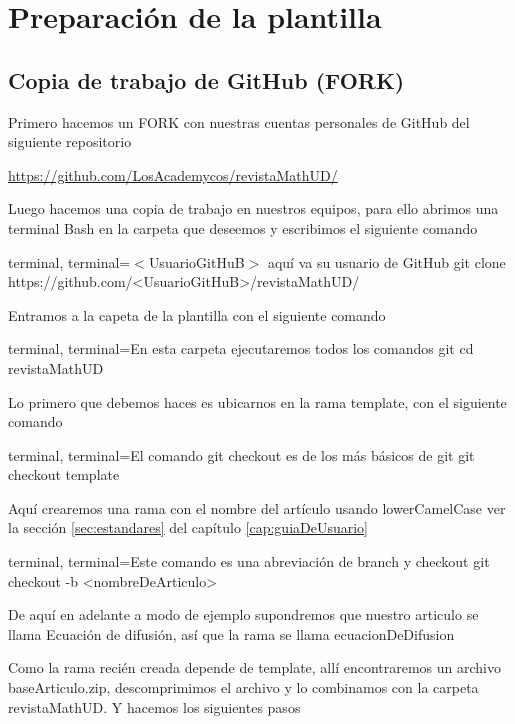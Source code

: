 {\justifying
	\chapter{Preparación de la plantilla}
	\section{Copia de trabajo de GitHub (FORK)}
	Primero hacemos un FORK con nuestras cuentas personales de GitHub del siguiente repositorio
	\begin{center}
		\href{https://github.com/LosAcademycos/revistaMathUD/} {https://github.com/LosAcademycos/revistaMathUD/}
	\end{center}
	Luego hacemos una copia de trabajo en nuestros equipos, para ello abrimos una terminal Bash en la carpeta que deseemos y escribimos el siguiente comando 
	\begin{tcblisting}{terminal, terminal={$<$UsuarioGitHuB$>$ aquí va su usuario de GitHub}}
		git clone https://github.com/<UsuarioGitHuB>/revistaMathUD/ 
	\end{tcblisting}
	Entramos a la capeta de la plantilla con el siguiente comando
	\begin{tcblisting}{terminal, terminal={En esta carpeta ejecutaremos todos los comandos git}}
	cd revistaMathUD
	\end{tcblisting}
	Lo primero que debemos haces es ubicarnos en la rama template, con el siguiente comando 
	\begin{tcblisting}{terminal, terminal={El comando git checkout es de los más básicos de git}}
		git checkout template
	\end{tcblisting}
	Aquí crearemos una rama con el nombre del artículo usando lowerCamelCase ver la sección \ref{sec:estandares} del capítulo \ref{cap:guiaDeUsuario}
	\begin{tcblisting}{terminal, terminal={Este comando es una abreviación de branch y checkout}}
		git checkout -b <nombreDeArticulo>
	\end{tcblisting}
	\begin{mybox}
		De aquí en adelante a modo de ejemplo supondremos que nuestro articulo se llama Ecuación de difusión, así que la rama se llama ecuacionDeDifusion
	\end{mybox}
	Como la rama recién creada depende de template, allí encontraremos un archivo baseArticulo.zip, descomprimimos el archivo y lo combinamos con la carpeta revistaMathUD. Y hacemos los siguientes pasos
}
